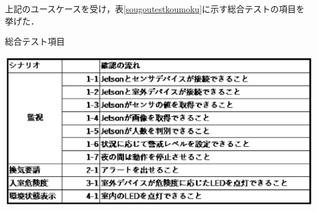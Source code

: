 上記のユースケースを受け，表\ref{sougoutestkoumoku}に示す総合テストの項目を挙げた．

\begin{table}
	\centering
	\caption{総合テスト項目}
	\label{sougoutestkoumoku}
	\includegraphics[width=0.9\linewidth]{test/sougoutest_koumoku}
\end{table}
\newpage